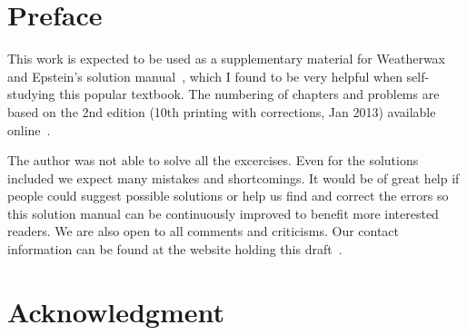 \chapter*{Preface}

This work is expected to be used as a supplementary material for Weatherwax and
Epstein's solution manual~\cite{weatherwax2013solution}, which I found to be
very helpful when self-studying this popular textbook. The numbering of chapters
and problems are based on the 2nd edition (10th printing with corrections, Jan 2013) available
online~\cite{friedman2009elements}.

The author was not able to solve all the excercises. Even for the solutions
included we expect many mistakes and shortcomings. It would be of great help if
people could suggest possible solutions or help us find and correct the errors
so this solution manual can be continuously improved to benefit more interested
readers. We are also open to all comments and criticisms. Our contact
information can be found at the website holding this draft~\cite{wu2016partial}.


\chapter*{Acknowledgment}
